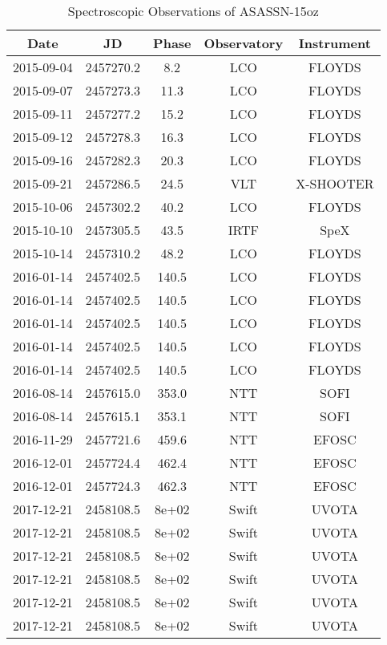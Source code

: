 \begin{table}
\centering
\caption{Spectroscopic Observations of ASASSN-15oz}
\begin{tabular}{ccccc}
Date & JD & Phase & Observatory & Instrument \\
\hline
2015-09-04 & 2457270.2 & 8.2 & LCO & FLOYDS \\
2015-09-07 & 2457273.3 & 11.3 & LCO & FLOYDS \\
2015-09-11 & 2457277.2 & 15.2 & LCO & FLOYDS \\
2015-09-12 & 2457278.3 & 16.3 & LCO & FLOYDS \\
2015-09-16 & 2457282.3 & 20.3 & LCO & FLOYDS \\
2015-09-21 & 2457286.5 & 24.5 & VLT & X-SHOOTER \\
2015-10-06 & 2457302.2 & 40.2 & LCO & FLOYDS \\
2015-10-10 & 2457305.5 & 43.5 & IRTF & SpeX \\
2015-10-14 & 2457310.2 & 48.2 & LCO & FLOYDS \\
2016-01-14 & 2457402.5 & 140.5 & LCO & FLOYDS \\
2016-01-14 & 2457402.5 & 140.5 & LCO & FLOYDS \\
2016-01-14 & 2457402.5 & 140.5 & LCO & FLOYDS \\
2016-01-14 & 2457402.5 & 140.5 & LCO & FLOYDS \\
2016-01-14 & 2457402.5 & 140.5 & LCO & FLOYDS \\
2016-08-14 & 2457615.0 & 353.0 & NTT & SOFI \\
2016-08-14 & 2457615.1 & 353.1 & NTT & SOFI \\
2016-11-29 & 2457721.6 & 459.6 & NTT & EFOSC \\
2016-12-01 & 2457724.4 & 462.4 & NTT & EFOSC \\
2016-12-01 & 2457724.3 & 462.3 & NTT & EFOSC \\
2017-12-21 & 2458108.5 & 8e+02 & Swift & UVOTA \\
2017-12-21 & 2458108.5 & 8e+02 & Swift & UVOTA \\
2017-12-21 & 2458108.5 & 8e+02 & Swift & UVOTA \\
2017-12-21 & 2458108.5 & 8e+02 & Swift & UVOTA \\
2017-12-21 & 2458108.5 & 8e+02 & Swift & UVOTA \\
2017-12-21 & 2458108.5 & 8e+02 & Swift & UVOTA \\
\end{tabular}
\end{table}

